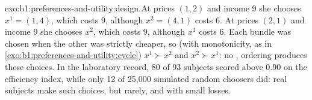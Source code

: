 \begin{solution}{exo:b1:preferences-and-utility:design}
At prices $(1, 2)$ and income 9 she chooses $x^1 = (1, 4)$, which costs 9,
although $x^2 = (4, 1)$ costs 6. At prices $(2, 1)$ and income 9 she chooses
$x^2$, which costs 9, although $x^1$ costs 6. Each bundle was chosen when the
other was strictly cheaper, so (with monotonicity, as in
\cref{exo:b1:preferences-and-utility:cycle}) $x^1 \succ x^2$ and $x^2 \succ x^1$:
no ,  ordering produces these choices. In the laboratory
record, 80 of 93 subjects scored above 0.90 on the efficiency index, while
only 12 of 25,000 simulated random choosers did: real subjects make such
choices, but rarely, and with small losses. %
\end{solution}

